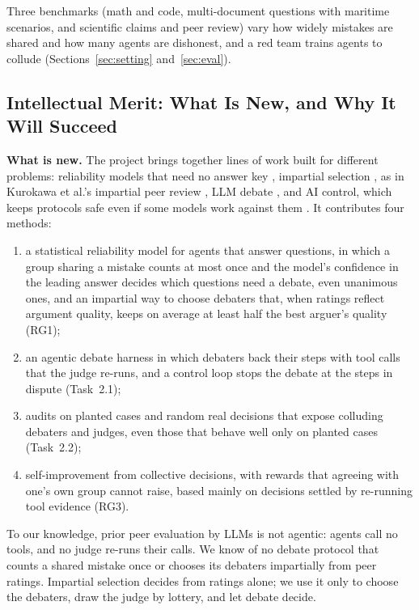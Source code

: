 \documentclass[12pt,letterpaper]{article}
\newcommand{\hd}[1]{\ifhmode\par\fi\addvspace{1pt}\noindent\textbf{#1}\hspace{0.35em}}
\begin{document}
Three benchmarks (math and code, multi-document questions with maritime scenarios, and scientific claims and peer review) vary how widely mistakes are shared and how many agents are dishonest, and a red team trains agents to collude \citep{greenblatt2024control} (Sections~\ref{sec:setting} and~\ref{sec:eval}).

\subsection{Intellectual Merit: What Is New, and Why It Will Succeed}\label{sec:merit}
\hd{What is new.} The project brings together lines of work built for different problems: reliability models that need no answer key \citep{dawid1979maximum}, impartial selection \citep{holzman2013impartial}, as in Kurokawa et al.'s impartial peer review \citep{kurokawa2015impartial}, LLM debate \citep{irving2018debate,du2024debate}, and AI control, which keeps protocols safe even if some models work against them \citep{greenblatt2024control}. It contributes four methods:
\begin{enumerate}[label=(\roman*),leftmargin=2.2em]
\item a statistical reliability model for agents that answer questions, in which a group sharing a mistake counts at most once and the model's confidence in the leading answer decides which questions need a debate, even unanimous ones, and an impartial way to choose debaters that, when ratings reflect argument quality, keeps on average at least half the best arguer's quality (RG1);
\item an agentic debate harness in which debaters back their steps with tool calls that the judge re-runs, and a control loop stops the debate at the steps in dispute (Task~2.1);
\item audits on planted cases and random real decisions that expose colluding debaters and judges, even those that behave well only on planted cases (Task~2.2);
\item self-improvement from collective decisions, with rewards that agreeing with one's own group cannot raise, based mainly on decisions settled by re-running tool evidence (RG3).
\end{enumerate}
To our knowledge, prior peer evaluation by LLMs is not agentic: agents call no tools, and no judge re-runs their calls. We know of no debate protocol that counts a shared mistake once or chooses its debaters impartially from peer ratings. Impartial selection decides from ratings alone; we use it only to choose the debaters, draw the judge by lottery, and let debate decide.
\end{document}
